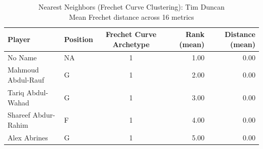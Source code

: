 \begin{table}[t]
\caption*{
{\fontsize{20}{25} Nearest Neighbors (Frechet Curve Clustering): Tim Duncan\fontsize{12}{15}\selectfont } \\ 
{\fontsize{14}{17}\selectfont  Mean Frechet distance across 16 metrics\fontsize{12}{15}\selectfont }
} 
\fontsize{12.0pt}{14.0pt}\selectfont
\begin{tabular*}{\linewidth}{@{\extracolsep{\fill}}llcrr}
\toprule
Player & Position & Frechet Curve Archetype & Rank (mean) & Distance (mean) \\ 
\midrule\addlinespace[2.5pt]
No Name & NA & 1 & 1.00 & 0.00 \\ 
Mahmoud Abdul-Rauf & G & 1 & 2.00 & 0.00 \\ 
Tariq Abdul-Wahad & G & 1 & 3.00 & 0.00 \\ 
Shareef Abdur-Rahim & F & 1 & 4.00 & 0.00 \\ 
Alex Abrines & G & 1 & 5.00 & 0.00 \\ 
\bottomrule
\end{tabular*}
\end{table}

